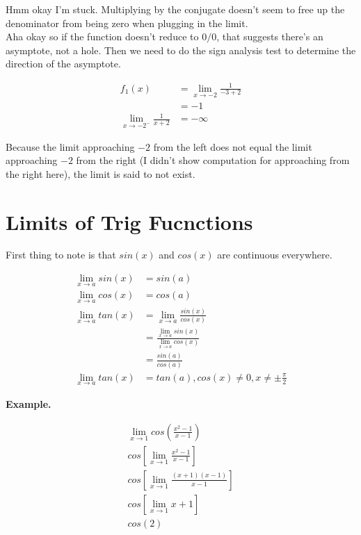 \documentclass{article}
\begin{document}
Hmm okay I'm stuck. Multiplying by the conjugate doesn't seem to free up the denominator
from being zero when plugging in the limit.\\

Aha okay so if the function doesn't reduce to $0/0$, that suggests there's an asymptote,
not a hole. Then we need to do the sign analysis test to determine the direction of the
asymptote.

\begin{align*}
    f_1(x) &= \lim_{x\to -2} \frac{1}{-3+2}\\
           &= -1\\
    \lim_{x\to -2^-} \frac{1}{x + 2} &= -\infty
\end{align*}

Because the limit approaching $-2$ from the left does not equal the limit approaching $-2$
from the right (I didn't show computation for approaching from the right here), the limit
is said to not exist.

\section{Limits of Trig Fucnctions}

First thing to note is that $sin(x)$ and $cos(x)$ are continuous everywhere.

\begin{align*}
    \lim_{x\to a} sin(x) &= sin(a)\\
    \lim_{x\to a} cos(x) &= cos(a)\\
    \lim_{x\to a} tan(x) &= \lim_{x\to a} \frac{sin(x)}{cos(x)}\\
                         &= \frac{\lim_{x\to a} sin(x)}{\lim_{x\to a} cos(x)}\\
                         &= \frac{sin(a)}{cos(a)}\\
    \lim_{x\to a} tan(x) &= tan(a), cos(x) \neq 0, x \neq \pm \frac{\pi}{2}
\end{align*}

\textbf{Example.}

\begin{align}
    \lim_{x\to 1} cos \left( \frac{x^2-1}{x-1}\right)\\
    cos \left[ \lim_{x\to 1} \frac{x^2-1}{x-1} \right]\\
    cos \left[ \lim_{x\to 1} \frac{(x+1)(x-1)}{x-1} \right]\\
    cos[\lim_{x\to 1} x+1]\\
    cos(2)
\end{align}
\end{document}
